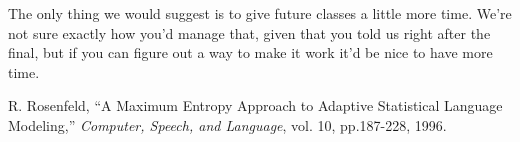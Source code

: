 \documentclass[11pt]{article}
\begin{document}
The only thing we would suggest is to give future classes a little more time.
We're not sure exactly how you'd manage that, given that you told us right
after the final, but if you can figure out a way to make it work it'd be nice
to have more time.

\begin{thebibliography}{}

R. Rosenfeld,
``A Maximum Entropy Approach to Adaptive Statistical Language Modeling,''
{\em Computer, Speech, and Language}, vol. 10, pp.187-228, 1996.

\end{thebibliography}
\end{document}
